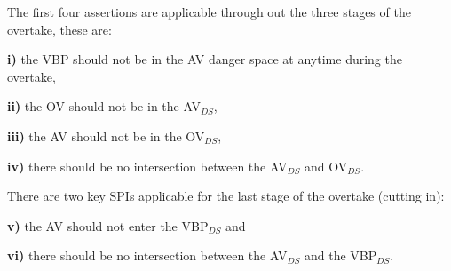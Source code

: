 The first four assertions are applicable through out the three stages of the overtake, these are:

\noindent \textbf{i)} the VBP should not be in the AV danger space at anytime during the overtake, 

\noindent \textbf{ii)} the OV should not be in the AV$_{DS}$, 

\noindent \textbf{iii)} the AV should not be in the OV$_{DS}$, 

\noindent \textbf{iv)} there should be no intersection between the AV$_{DS}$ and OV$_{DS}$.

There are two key SPIs applicable for the last stage of the overtake (cutting in):

\noindent \textbf{v)} the AV should not enter the VBP$_{DS}$ and 

\noindent \textbf{vi)} there should be no intersection between the AV$_{DS}$ and the VBP$_{DS}$. 

